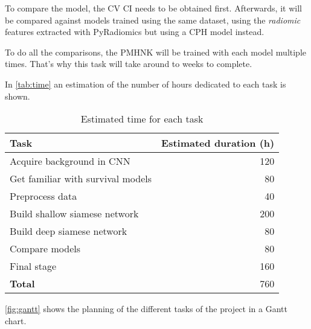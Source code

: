 To compare the model, the \gls{CV} \gls{CI} needs to be obtained first. Afterwards,
it will be compared against models trained using the same dataset, using the 
\emph{radiomic} features extracted with PyRadiomics but using
a \gls{CPH} model instead.
~\cites{medical:py-radiomics}{medical:cox}

To do all the comparisons, the \gls{PMHNK} will be trained with each model multiple times.
That's why this task will take around to weeks to complete.


In \autoref{tab:time} an estimation of the number of hours dedicated to each task is shown.

\begin{table}[H]
  \centering{}
  \begin{tabular}{|l|r|}
    \hline
    Task & Estimated duration (h) \\ \hline \hline
    Acquire background in CNN & 120 \\ \hline
    Get familiar with survival models & 80 \\ \hline
    Preprocess data & 40 \\ \hline
    Build shallow siamese network & 200 \\ \hline
    Build deep siamese network & 80 \\ \hline
    Compare models & 80 \\ \hline
    Final stage & 160 \\ 

  
    \hline \hline
    \textbf{Total} & 760 \\
    \hline
  \end{tabular}
  \caption{Estimated time for each task \label{tab:time}}
\end{table}


\autoref{fig:gantt} shows the planning of the different tasks of the project in a Gantt chart.

